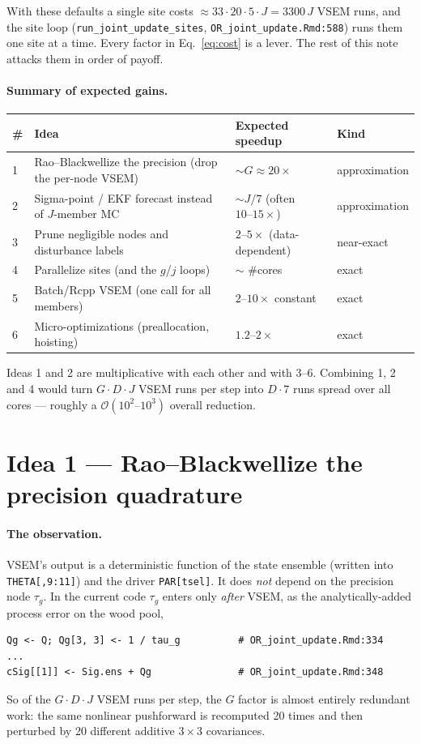 \documentclass[11pt]{article}
\newcommand{\code}[1]{\texttt{#1}}
\newcommand{\bigO}{\mathcal{O}}
\begin{document}
With these defaults a single site costs $\approx 33\cdot20\cdot5\cdot J = 3300\,J$
VSEM runs, and the site loop (\code{run\_joint\_update\_sites},
\code{OR\_joint\_update.Rmd:588}) runs them one site at a time. Every factor in
Eq.~\eqref{eq:cost} is a lever. The rest of this note attacks them in order of payoff.

\paragraph{Summary of expected gains.}
\begin{center}
\begin{tabular}{@{}llll@{}}
\toprule
\# & Idea & Expected speedup & Kind \\
\midrule
1 & Rao--Blackwellize the precision (drop the per-node VSEM) & $\sim G \approx 20\times$ & approximation \\
2 & Sigma-point / EKF forecast instead of $J$-member MC     & $\sim J/7$ (often $10\text{--}15\times$) & approximation \\
3 & Prune negligible nodes and disturbance labels           & $2\text{--}5\times$ (data-dependent) & near-exact \\
4 & Parallelize sites (and the $g$/$j$ loops)               & $\sim$ \#cores & exact \\
5 & Batch/Rcpp VSEM (one call for all members)              & $2\text{--}10\times$ constant & exact \\
6 & Micro-optimizations (preallocation, hoisting)           & $1.2\text{--}2\times$ & exact \\
\bottomrule
\end{tabular}
\end{center}
Ideas 1 and 2 are multiplicative with each other and with 3--6. Combining 1, 2 and 4
would turn $G\cdot D\cdot J$ VSEM runs per step into $D\cdot 7$ runs spread over all
cores --- roughly a $\bigO(10^2\text{--}10^3)$ overall reduction.

\section{Idea 1 --- Rao--Blackwellize the precision quadrature}
\label{sec:rb}

\paragraph{The observation.} VSEM's output is a deterministic function of the state
ensemble (written into \code{THETA[,9:11]}) and the driver \code{PAR[tsel]}. It does
\emph{not} depend on the precision node $\tau_g$. In the current code $\tau_g$ enters
only \emph{after} VSEM, as the analytically-added process error on the wood pool,
\begin{lstlisting}
Qg <- Q; Qg[3, 3] <- 1 / tau_g          # OR_joint_update.Rmd:334
...
cSig[[1]] <- Sig.ens + Qg               # OR_joint_update.Rmd:348
\end{lstlisting}
So of the $G\cdot D\cdot J$ VSEM runs per step, the $G$ factor is almost entirely
redundant work: the same nonlinear pushforward is recomputed 20 times and then
perturbed by 20 different additive $3\times3$ covariances.
\end{document}
